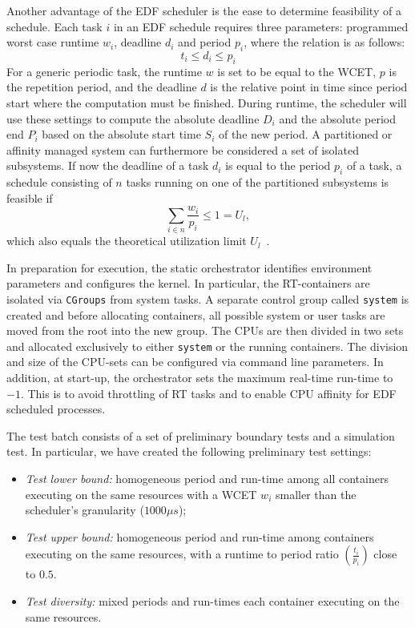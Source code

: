 \documentclass[]{scrartcl}
\begin{document}
Another advantage of the EDF scheduler is the ease to determine feasibility of a schedule.
Each task $i$ in an EDF schedule requires three parameters: programmed worst case runtime $w_i$, deadline $d_i$ and period $p_i$, where the relation is as follows:
\begin{equation}
t_i \le d_i \le p_i
\end{equation}
For a generic periodic task, the runtime $w$ is set to be equal to the WCET, $p$ is the repetition period, and the deadline $d$ is the relative point in time since period start where the computation must be finished. 
During runtime, the scheduler will use these settings to compute the absolute deadline $D_i$ and the absolute period end $P_i$ based on the absolute start time $S_i$ of the new period.
A partitioned or affinity managed system can furthermore be considered a set of isolated subsystems.
If now the deadline of a task $d_i$ is equal to the period $p_i$ of a task, a schedule consisting of $n$ tasks running on one of the partitioned subsystems is feasible if
\begin{equation}
\sum_{i \in n} \frac{w_i}{p_i} \le 1 = U_l,
\end{equation}
which also equals the theoretical utilization limit $U_l$~\cite{Buttazzo2011}. 

In preparation for execution, the static orchestrator identifies environment parameters and configures the kernel.
In particular, the RT-containers are isolated via %
\texttt{CGroups} from system tasks.
A separate control group called \texttt{system} is created and before allocating containers, all possible system or user tasks are moved from the root into the new group.
The CPUs are then divided in two sets and allocated exclusively to either \texttt{system} or the running containers.
The division and size of the CPU-sets can be configured via command line parameters.
In addition, at start-up, the orchestrator sets the maximum real-time run-time to $-1$. This is to avoid throttling of RT tasks and to enable CPU affinity for EDF scheduled processes.

The test batch consists of a set of preliminary boundary tests and a simulation test.
In particular, we have created the following preliminary test settings:

\begin{itemize}
	\item \textit{Test lower bound:} homogeneous period and run-time among all containers executing on the same resources with a WCET $w_i$ smaller than the scheduler's granularity ($1000\mu s$);
	\item \textit{Test upper bound:} homogeneous period and run-time among containers executing on the same resources, with a runtime to period ratio $(\frac{t_i}{p_i})$ close to $0.5$.
	\item \textit{Test diversity:} mixed periods and run-times each container executing on the same resources.
\end{itemize}
\end{document}

